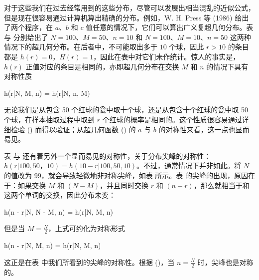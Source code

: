 对于这些我们在过去经常用到的这些分布，尽管可以发展出相当混乱的近似公式，但是现在很容易通过计算机算出精确的分布。例如，W. H. Press 等 (1986) 给出了两个程序，在 $a$、$b$ 和 $c$ 值任意的情况下，它们可以算出广义复超几何分布。表 \in[t-3-1] 与 \in[t-3-2] 分别给出了 $N = 100$、$M = 50$、$n = 10$ 和 $N = 100$、$M = 10$、$n = 50$ 这两种情况下的超几何分布。在后者中，不可能取出多于 $10$ 个球，因此 $r > 10$ 的条目都是 $h(r) = 0$，$H(r) = 1$，因此在表中对它们未作统计。惊人的事实是，$h(r)$ 正值对应的条目是相同的，亦即超几何分布在交换 $M$ 和 $n$ 的情况下具有对称性质

\placeformula[3-29]
\startformula
h(r|N, M, n) = h(r|N, n, M)
\stopformula

无论我们是从包含 50 个红球的瓮中取十个球，还是从包含十个红球的瓮中取 50 个球，在样本抽取过程中取到 $r$ 个红球的概率是相同的。这个性质很容易通过详细检验 (\in[3-22]) 而得以验证；从超几何函数 (\in[3-23]) 的 $a$ 与 $b$ 的对称性来看，这一点也显而易见。

表 \in[t-3-1] 与 \in[t-3-2] 还有着另外一个显而易见的对称性，关于分布尖峰的对称性：$h(r|100, 50， 10) = h(10 - r|100, 50, 10)$。不过，通常情况下并非如此。将 $N$ 的值改为 $99$，就会导致轻微地非对称尖峰，如表 \in[t-3-3] 所示。表 \in[t-3-1] 的尖峰的出现，原因在于：如果交换 $M$ 和 $(N - M)$，并且同时交换 $r$ 和 $(n - r)$，那么就相当于和这两个单词的交换，因此分布未变：

\placeformula[3-30]
\startformula
h(n - r|N, N - M, n) = h(r|N, M, n)
\stopformula

但是当 $M = \frac{N}{2}$，上式可约化为对称形式

\placeformula[3-31]
\startformula
h(n - r|N, M, n) = h(r|N, M, n)
\stopformula

这正是在表 \in[t-3-1] 中我们所看到的尖峰的对称性。根据 (\in[3-29])，当 $n = \frac{N}{2}$ 时，尖峰也是对称的。


